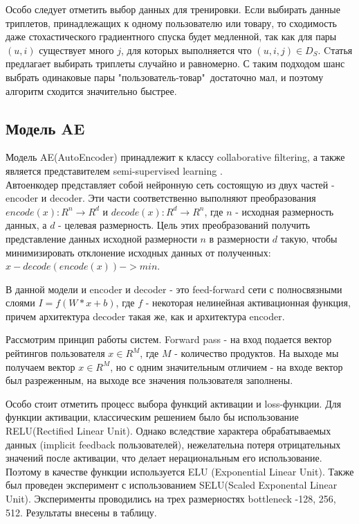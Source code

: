 \documentclass[14pt]{mmcs_article}
\begin{document}
Особо следует отметить выбор данных для тренировки. Если выбирать данные триплетов, принадлежащих к одному пользователю или товару, то сходимость даже стохастического градиентного спуска будет медленной, так как для пары $(u,i)$ существует много $j$, для которых выполняется что $(u,i,j) \in D_S$. Cтатья \cite{BPR:1205} предлагает выбирать триплеты случайно и равномерно. С таким подходом шанс выбрать одинаковые пары "пользователь-товар"\ достаточно мал, и поэтому алгоритм сходится значительно быстрее.

\subsection{ Модель AE}
Модель AE(AutoEncoder) принадлежит к классу collaborative filtering, а также является представителем semi-supervised learning \cite{AE:a1}. \\

Автоенкодер представляет собой нейронную сеть состоящую из двух частей - encoder и decoder. Эти части соответственно выполняют преобразования  $encode(x) : R^n \rightarrow R^d$ и $decode(x) : R^d \rightarrow R^n$, где $n$ - исходная размерность данных, а $d$ - целевая размерность. Цель этих преобразований получить представление данных исходной размерности $n$ в размерности $d$ такую, чтобы минимизировать отклонение исходных данных от полученных: $x - decode(encode(x)) -> min$.

В данной модели и encoder и decoder - это feed-forward сети с полносвязными слоями $I = f(W*x + b)$, где $f$ - некоторая нелинейная активационная функция, причем архитектура decoder такая же, как и архитектура encoder. 

Рассмотрим принцип работы систем. Forward pass - на вход подается вектор рейтингов пользователя $x \in R^M$, где $M$ - количество продуктов. На выходе мы получаем вектор $x \in R^M$, но с одним значительным отличием - на входе вектор был разреженным, на выходе все значения пользователя заполнены.

Особо стоит отметить процесс выбора функций активации и loss-функции. Для функции активации, классическим решением было бы использование RELU(Rectified Linear Unit). Однако вследствие характера обрабатываемых данных (implicit feedback пользователей), нежелательна потеря отрицательных значений после активации, что делает нерациональным его использование. Поэтому в качестве функции используется ELU (Exponential Linear Unit). Также был проведен эксперимент с использованием SELU(Scaled Exponental Linear Unit). Эксперименты проводились на трех размерностях bottleneck -128, 256, 512. Результаты внесены в таблицу.\\
\end{document}
